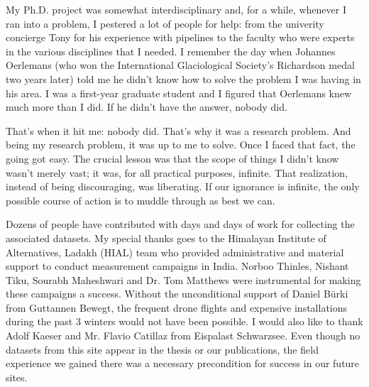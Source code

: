 My Ph.D. project was somewhat interdisciplinary and, for a while, whenever I ran into a problem, I pestered a
lot of people for help: from the univerity concierge Tony for his experience with pipelines to the faculty who
were experts in the various disciplines that I needed. I remember the day when Johannes Oerlemans (who won the
International Glaciological Society's Richardson medal two years later) told me he didn't know how to solve the
problem I was having in his area. I was a first-year graduate student and I figured that Oerlemans knew much
more than I did. If he didn't have the answer, nobody did.

That's when it hit me: nobody did. That's why it was a research problem. And being my research problem, it was
up to me to solve. Once I faced that fact, the going got easy. The crucial lesson was that the scope of things I
didn't know wasn't merely vast; it was, for all practical purposes, infinite. That realization, instead of being
discouraging, was liberating. If our ignorance is infinite, the only possible course of action is to muddle
through as best we can.

Dozens of people have contributed with days and days of work for collecting the associated datasets. My special
thanks goes to the Himalayan Institute of Alternatives, Ladakh (HIAL) team who provided administrative and
material support to conduct measurement campaigns in India. Norboo Thinles, Nishant Tiku, Sourabh Maheshwari and
Dr. Tom Matthews were instrumental for making these campaigns a success. Without the unconditional support of
Daniel Bürki from Guttannen Bewegt, the frequent drone flights and expensive installations during the past 3
winters would not have been possible. I would also like to thank Adolf Kaeser and Mr. Flavio Catillaz from
Eispalast Schwarzsee. Even though no datasets from this site appear in the thesis or our publications, the field
experience we gained there was a necessary precondition for success in our future sites. 

